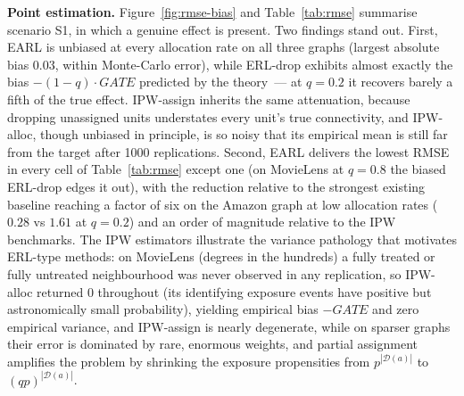 \documentclass[sigconf,nonacm]{acmart}
\begin{document}
\textbf{Point estimation.} Figure~\ref{fig:rmse-bias} and Table~\ref{tab:rmse} summarise scenario S1, in which a genuine effect is present. Two findings stand out. First, EARL is unbiased at every allocation rate on all three graphs (largest absolute bias $0.03$, within Monte-Carlo error), while ERL-drop exhibits almost exactly the bias $-(1-q)\cdot GATE$ predicted by the theory~--- at $q=0.2$ it recovers barely a fifth of the true effect. IPW-assign inherits the same attenuation, because dropping unassigned units understates every unit's true connectivity, and IPW-alloc, though unbiased in principle, is so noisy that its empirical mean is still far from the target after 1000 replications. Second, EARL delivers the lowest RMSE in every cell of Table~\ref{tab:rmse} except one (on MovieLens at $q=0.8$ the biased ERL-drop edges it out), with the reduction relative to the strongest existing baseline reaching a factor of six on the Amazon graph at low allocation rates ($0.28$ vs $1.61$ at $q=0.2$) and an order of magnitude relative to the IPW benchmarks. The IPW estimators illustrate the variance pathology that motivates ERL-type methods: on MovieLens (degrees in the hundreds) a fully treated or fully untreated neighbourhood was never observed in any replication, so IPW-alloc returned $0$ throughout (its identifying exposure events have positive but astronomically small probability), yielding empirical bias $-GATE$ and zero empirical variance, and IPW-assign is nearly degenerate, while on sparser graphs their error is dominated by rare, enormous weights, and partial assignment amplifies the problem by shrinking the exposure propensities from $p^{|\mathcal D(a)|}$ to $(qp)^{|\mathcal D(a)|}$.
\end{document}
